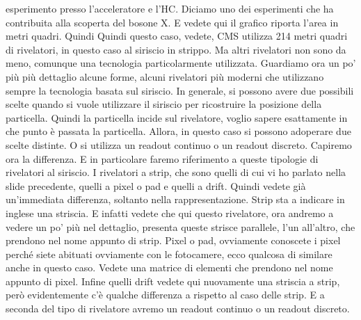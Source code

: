 esperimento presso l'acceleratore e l'HC. Diciamo uno dei esperimenti che ha contribuita alla scoperta del bosone X. E vedete qui il grafico riporta l'area in metri quadri. Quindi Quindi questo caso, vedete, CMS utilizza 214 metri quadri di rivelatori, in questo caso al siriscio in strippo. Ma altri rivelatori non sono da meno, comunque una tecnologia particolarmente utilizzata. Guardiamo ora un po' più più dettaglio alcune forme, alcuni rivelatori più moderni che utilizzano sempre la tecnologia basata sul siriscio. In generale, si possono avere due possibili scelte quando si vuole utilizzare il siriscio per ricostruire la posizione della particella. Quindi la particella incide sul rivelatore, voglio sapere esattamente in che punto è passata la particella. Allora, in questo caso si possono adoperare due scelte distinte. O si utilizza un readout continuo o un readout discreto. Capiremo ora la differenza. E in particolare faremo riferimento a queste tipologie di rivelatori al siriscio. I rivelatori a strip, che sono quelli di cui vi ho parlato nella slide precedente, quelli a pixel o pad e quelli a drift. Quindi vedete già un'immediata differenza, soltanto nella rappresentazione. Strip sta a indicare in inglese una striscia. E infatti vedete che qui questo rivelatore, ora andremo a vedere un po' più nel dettaglio, presenta queste strisce parallele, l'un all'altro, che prendono nel nome appunto di strip. Pixel o pad, ovviamente conoscete i pixel perché siete abituati ovviamente con le fotocamere, ecco qualcosa di similare anche in questo caso. Vedete una matrice di elementi che prendono nel nome appunto di pixel. Infine quelli drift vedete qui nuovamente una striscia a strip, però evidentemente c'è qualche differenza a rispetto al caso delle strip. E a seconda del tipo di rivelatore avremo un readout continuo o un readout discreto. 

